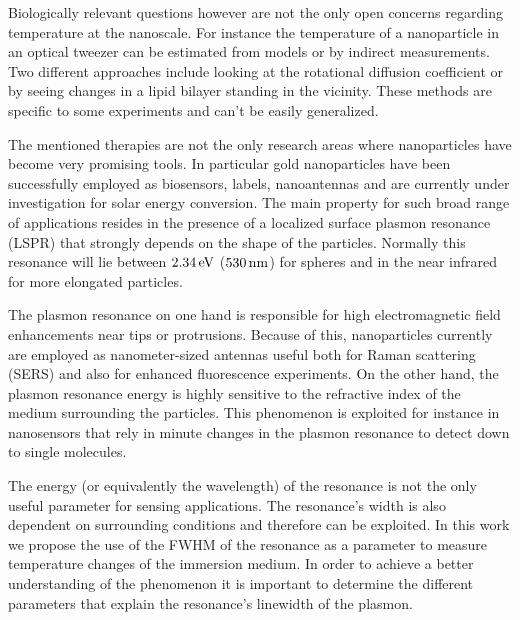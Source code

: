 Biologically relevant questions however are not the only open concerns regarding
temperature at the nanoscale. For instance the temperature of a nanoparticle in
an optical tweezer can be estimated from models\cite{Ruijgrok2011a} or by
indirect measurements. Two different approaches include looking at the
rotational diffusion coefficient\cite{Trojek2012} or by seeing
changes in a lipid bilayer standing in the vicinity\cite{Ma2014a,Urban2009}.
These methods are specific to some experiments and can't be easily generalized.

The mentioned therapies are not the only research areas where nanoparticles have
become very promising tools. In particular gold nanoparticles have been
successfully employed as biosensors\cite{Zijlstra2012,Beuwer2015},
labels\cite{Spillane2014,Conde2013}, nanoantennas\cite{Schuller2010b,Leduc2013}
and are currently under investigation for solar energy
conversion\cite{Catchpole2008}. The main property for such broad range of
applications resides in the presence of a localized surface plasmon resonance
(LSPR) that strongly depends on the shape of the particles\cite{Zijlstra2011}.
Normally this resonance will lie between $2.34\,\textrm{eV}$ ($530\,\textrm{nm}$) for spheres and in 
the near infrared for more elongated particles.

The plasmon resonance on one hand is responsible for high electromagnetic field
enhancements near tips or protrusions\cite{Beversluis2003a,Mohamed2000}.
Because of this, nanoparticles currently are employed as nanometer-sized
antennas useful both for Raman scattering (SERS)\cite{Sivapalan2013} and also for
enhanced fluorescence\cite{Yuan2013,Khatua2014} experiments. On the other hand,
the plasmon resonance energy is highly sensitive to the refractive
index\cite{Prasad2015} of the medium surrounding the particles. This phenomenon
is exploited for instance in nanosensors that rely in minute changes in the
plasmon resonance to detect down to single molecules\cite{Zijlstra2012}.

The energy (or equivalently the wavelength) of the resonance is not the only
useful parameter for sensing applications. The resonance's width is also
dependent on surrounding conditions\cite{Liu2009b,Konrad2013} and therefore can
be exploited. In this work we propose the use of the FWHM of the resonance as a
parameter to measure temperature changes of the immersion medium. In order to
achieve a better understanding of the phenomenon it is important to determine
the different parameters that explain the resonance's linewidth of the plasmon.

